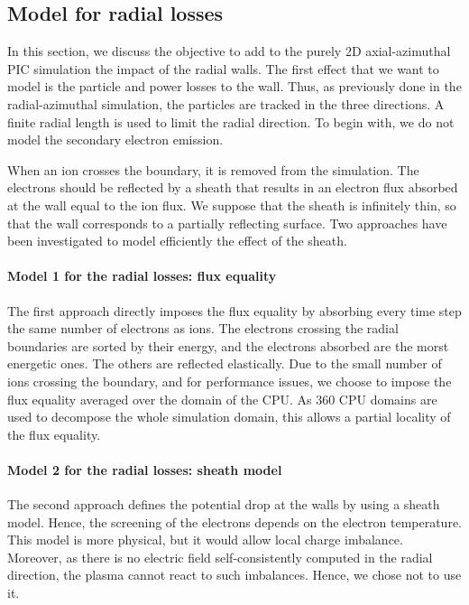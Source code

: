 
\subsection{Model for radial losses} \label{subsec-fakeR}

In this section, we discuss the objective to add to the purely \ac{2D} axial-azimuthal \ac{PIC} simulation the impact of the radial walls.
The first effect that we want to model is the particle and power losses to the wall.
Thus, as previously done in the radial-azimuthal simulation, the particles are tracked in the three directions.
A finite radial length is used to limit the radial direction.
To begin with, we do not model the secondary electron emission.

When an ion crosses the boundary, it is removed from the simulation.
The electrons should be reflected by a sheath that results in an electron flux absorbed at the wall equal to the ion flux.
We suppose that the sheath is infinitely thin, so that the wall corresponds to a partially reflecting surface.
Two approaches have been investigated to model efficiently the effect of the sheath.
\paragraph{Model 1 for the  radial losses\string: flux equality\\}
The first approach directly imposes the flux equality by absorbing every time step the same number of electrons as ions.
The electrons crossing the radial boundaries are sorted by their energy, and the electrons absorbed are the morst energetic ones.
The others are reflected elastically.
Due to the small number of ions crossing the boundary, and for performance issues, we choose to impose the flux equality averaged over the domain of the CPU.
As 360 CPU domains are used to decompose the whole simulation domain, this allows a partial locality of the flux equality. 

\paragraph{ Model 2 for the radial losses\string: sheath model\\}

The second approach defines the potential drop at the walls by  using  a sheath model.
Hence, the screening of the electrons depends on the electron temperature.
This model is more physical, but it would allow local charge imbalance.
Moreover, as there is no electric field self-consistently computed in the radial direction, the plasma cannot react to such imbalances.
Hence, we chose not to use it.

